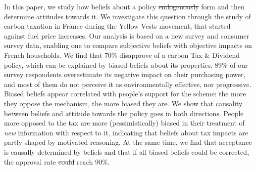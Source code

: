 \documentclass[12pt]{article} %
\providecommand{\DIFaddtex}[1]{{\protect\color{blue}\uwave{#1}}} %
\providecommand{\DIFdeltex}[1]{{\protect\color{red}\sout{#1}}}                      %
\providecommand{\DIFaddbegin}{} %
\providecommand{\DIFaddend}{} %
\providecommand{\DIFdelbegin}{} %
\providecommand{\DIFdelend}{} %
\providecommand{\DIFadd}[1]{\texorpdfstring{\DIFaddtex{#1}}{#1}} %
\providecommand{\DIFdel}[1]{\texorpdfstring{\DIFdeltex{#1}}{}} %
\newcommand{\DIFscaledelfig}{0.5}
\newlength{\DIFdelgraphicswidth} %
\newlength{\DIFdelgraphicsheight} %
\newcommand{\DIFaddincludegraphics}[2][]{{\color{blue}\fbox{\DIFOincludegraphics[#1]{#2}}}} %
\newcommand{\DIFdelincludegraphics}[2][]{%
\sbox{\DIFdelgraphicsbox}{\DIFOincludegraphics[#1]{#2}}%
\settoboxwidth{\DIFdelgraphicswidth}{\DIFdelgraphicsbox} %
\settoboxtotalheight{\DIFdelgraphicsheight}{\DIFdelgraphicsbox} %
\scalebox{\DIFscaledelfig}{%
\parbox[b]{\DIFdelgraphicswidth}{\usebox{\DIFdelgraphicsbox}\\[-\baselineskip] \rule{\DIFdelgraphicswidth}{0em}}\llap{\resizebox{\DIFdelgraphicswidth}{\DIFdelgraphicsheight}{%
\setlength{\unitlength}{\DIFdelgraphicswidth}%
\begin{picture}(1,1)%
\thicklines\linethickness{2pt} %
{\color[rgb]{1,0,0}\put(0,0){\framebox(1,1){}}}%
{\color[rgb]{1,0,0}\put(0,0){\line( 1,1){1}}}%
{\color[rgb]{1,0,0}\put(0,1){\line(1,-1){1}}}%
\end{picture}%
}\hspace*{3pt}}} %
} %
\DeclareRobustCommand{\DIFaddbegin}{\DIFOaddbegin \let\includegraphics\DIFaddincludegraphics} %
\DeclareRobustCommand{\DIFaddend}{\DIFOaddend \let\includegraphics\DIFOincludegraphics} %
\DeclareRobustCommand{\DIFdelbegin}{\DIFOdelbegin \let\includegraphics\DIFdelincludegraphics} %
\DeclareRobustCommand{\DIFdelend}{\DIFOaddend \let\includegraphics\DIFOincludegraphics} %
\begin{document}

In this paper, we study how beliefs about a policy \DIFdelbegin \DIFdel{endogenously }\DIFdelend form and then determine attitudes towards it. We investigate this question through the study of carbon taxation in France during the Yellow Vests movement, that started against fuel price increases. Our analysis is based on a new survey and consumer survey data, enabling one to compare subjective beliefs with objective impacts on French households. We find that 70\% disapprove of a carbon Tax \& Dividend policy, which can be explained by biased beliefs about its properties. 89\% of our survey respondents overestimate its negative impact on their purchasing power, and most of them do not perceive it as environmentally effective, nor progressive. Biased beliefs appear correlated with people’s support for the scheme: the more they oppose the mechanism, the more biased they are. We show that causality between beliefs and attitude towards the policy goes in both directions. People more opposed to the tax are more (pessimistically) biased in their treatment of \textit{new} information with respect to it, indicating that beliefs about tax impacts are partly shaped by motivated reasoning. At the same time, we find that acceptance is causally determined by beliefs and that if all biased beliefs could be corrected, the approval rate \DIFdelbegin \DIFdel{could }\DIFdelend \DIFaddbegin \DIFadd{would }\DIFaddend reach 90\%.
\end{document}
